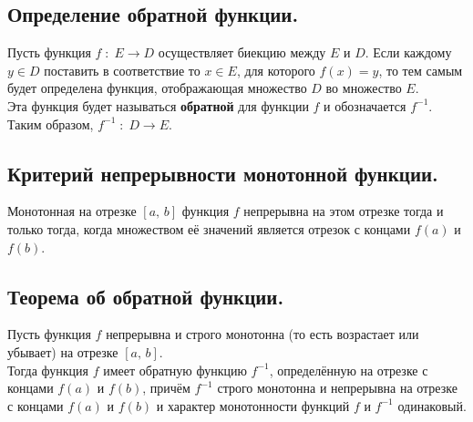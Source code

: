

\label{sec_Definition04}
\begin{definition}
    \subsection*{Определение обратной функции.}
    \begin{note}[purple]
        Пусть функция $f \; : \; E \rightarrow D$ осуществляет биекцию между $E$ и $D$.
        Если каждому $y \in D$ поставить в соответствие то $x \in E$, для которого $f(x) = y$, 
        то тем самым будет определена функция, отображающая множество $D$ во множество $E$. \\

        Эта функция будет называться \textbf{обратной} для функции $f$ и обозначается $f^{-1}$. \\
        Таким образом, $f^{-1} \; : \; D \rightarrow E$. 
    \end{note}

    \subsection*{Критерий непрерывности монотонной функции.}
    \begin{note}[purple]
        Монотонная на отрезке $[a, \, b]$ функция $f$ непрерывна на этом отрезке тогда и только тогда, 
        когда множеством её значений является отрезок с концами $f(a)$ и $f(b)$. 
    \end{note}

    \subsection*{Теорема об обратной функции.}
    \begin{note}[purple]
        Пусть функция $f$ непрерывна и строго монотонна (то есть возрастает или убывает) на 
        отрезке $[a, \, b]$. \\
        Тогда функция $f$ имеет обратную функцию $f^{-1}$, определённую на отрезке с концами 
        $f(a)$ и $f(b)$, причём $f^{-1}$ строго монотонна и непрерывна на отрезке с концами
        $f(a)$ и $f(b)$ и характер монотонности функций $f$ и $f^{-1}$ одинаковый. 
    \end{note}
\end{definition}